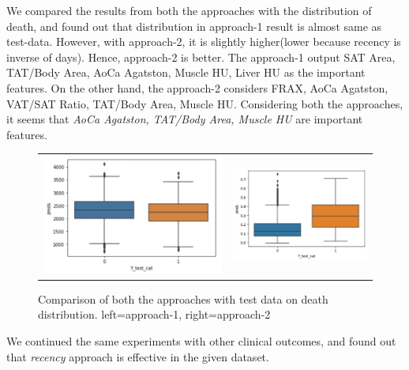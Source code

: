 We compared the results from both the approaches with the distribution of death, and found out that distribution in approach-1 result is almost same as test-data. However, with approach-2, it is slightly higher(lower because recency is inverse of days). Hence, approach-2 is better.
The approach-1 output SAT Area, TAT/Body Area, AoCa Agatston, Muscle HU, Liver HU as the important features. On the other hand, the approach-2 considers FRAX, AoCa Agatston, VAT/SAT Ratio, TAT/Body Area, Muscle HU. Considering both the approaches, it seems that \textit{AoCa Agatston, TAT/Body Area, Muscle HU} are important features.

\begin{figure}[H]
	\def\imgwidth{0.5\linewidth}
	\centering
	\begin{tabular}{cc}
		\includegraphics[width=0.4\linewidth]{images/death/a_1_comp_w_test.png} &
		\includegraphics[width=0.4\linewidth]{images/death/a_2_comp_w_test.png} \\
	\end{tabular}
	\caption{Comparison of both the approaches with test data on death distribution. left=approach-1, right=approach-2}
	\label{fig:death_results_dist_comp_with_test_data}
\end{figure}

We continued the same experiments with other clinical outcomes, and found out that \textit{recency} approach is effective in the given dataset.


